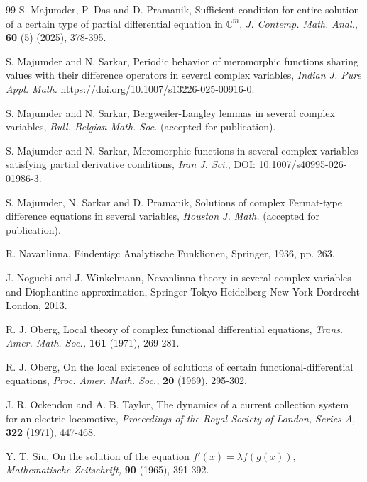 \documentclass[11pt,reqno]{amsart}
\numberwithin{equation}{section}
\begin{document}
\begin{thebibliography}{99}
 {\sc S. Majumder}, {\sc P. Das} and {\sc D. Pramanik}, Sufficient condition for entire solution of a certain type of partial differential equation in $\mathbb{C}^m$, \textit{J. Contemp. Math. Anal.}, \textbf{60} (5) (2025), 378-395.

 {\sc S. Majumder} and {\sc N. Sarkar}, Periodic behavior of meromorphic functions sharing values with their difference operators in several complex variables, \textit{Indian J. Pure Appl. Math.} https://doi.org/10.1007/s13226-025-00916-0.

 {\sc S. Majumder} and {\sc N. Sarkar}, Bergweiler-Langley lemmas in several complex variables, 
\textit{Bull. Belgian Math. Soc.} (accepted for publication).

 {\sc S. Majumder} and {\sc N. Sarkar}, Meromorphic functions in several complex variables
satisfying partial derivative conditions, \textit{Iran J. Sci.}, DOI: 10.1007/s40995-026-01986-3.

 {\sc S. Majumder}, {\sc N. Sarkar} and {\sc D. Pramanik}, Solutions of complex Fermat-type difference equations in several variables, \textit{Houston J. Math.} (accepted for publication).

 {\sc R. Navanlinna}, Eindentigc Analytische Funklionen, Springer, 1936, pp. 263.

 {\sc J. Noguchi} and {\sc J. Winkelmann}, Nevanlinna theory in several complex variables and Diophantine approximation, Springer Tokyo Heidelberg New York Dordrecht London, 2013.

 {\sc R. J. Oberg}, Local theory of complex functional differential equations, \textit{Trans. Amer. Math. Soc.,} \textbf{161} (1971), 269-281.

 {\sc R. J. Oberg}, On the local existence of solutions of certain functional-differential equations, \textit{Proc. Amer. Math. Soc.,} \textbf{20} (1969), 295-302.	

 {\sc J. R. Ockendon} and {\sc A. B. Taylor}, The dynamics of a current collection system for an electric locomotive, \textit{Proceedings of the Royal Society of London, Series A}, \textbf{322} (1971), 447-468.	
		
 {\sc Y. T. Siu}, On the solution of the equation $f'(x)=\lambda f(g(x))$, \textit{Mathematische Zeitschrift,} \textbf{90} (1965), 391-392.


\end{thebibliography}
\end{document}
